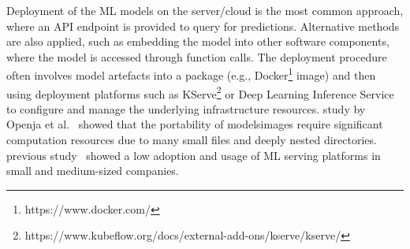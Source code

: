 Deployment of the ML \DIFdelbegin {}\DIFdelend models on the server/cloud is the most common approach, where an API endpoint is provided to query for predictions. Alternative methods are also applied, such as embedding the model into other software components, where the model is accessed through function calls. The deployment procedure often involves \DIFdelbegin {}\DIFdelend \DIFaddbegin {}\DIFaddend model artefacts into a package (e.g., Docker\footnote{https://www.docker.com/} image) and then using deployment platforms such as KServe\footnote{https://www.kubeflow.org/docs/external-add-ons/kserve/kserve/} or Deep Learning Inference Service~\cite{soifer2019deep} to configure and manage the underlying infrastructure resources. \DIFdelbegin {}\DIFdelend \DIFaddbegin {}\DIFaddend study by Openja et al.~\cite{openja} showed that \DIFdelbegin {}\DIFdelend \DIFaddbegin {}\DIFaddend the portability of models\DIFdelbegin {}\DIFdelend \DIFaddbegin {}\DIFaddend images require significant computation resources due to many small files and deeply nested directories. \DIFdelbegin {}\DIFdelend \DIFaddbegin {}\DIFaddend previous study~\cite{muiruri2022practices} showed a low adoption and usage of ML serving platforms in small and medium-sized companies\DIFaddbegin {}\DIFaddend .

